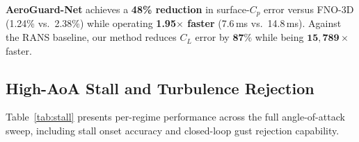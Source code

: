 \documentclass[10pt,twocolumn,letterpaper]{article}
\newcommand{\aeroguard}{\textbf{AeroGuard-Net}}
\newcommand{\CL}{C_L}
\newcommand{\Cp}{C_p}
\begin{document}
\aeroguard{} achieves a \textbf{48\% reduction} in surface-$\Cp$ error
versus FNO-3D (1.24\% vs.\ 2.38\%) while operating \textbf{1.95$\times$
faster} (7.6\,ms vs.\ 14.8\,ms). Against the RANS baseline, our
method reduces $\CL$ error by $\mathbf{87\%}$ while being
$\mathbf{15{,}789\times}$ faster.

\subsection{High-AoA Stall and Turbulence Rejection}
\label{subsec:stall}

Table~\ref{tab:stall} presents per-regime performance across the full
angle-of-attack sweep, including stall onset accuracy and closed-loop
gust rejection capability.

\begin{table}[t]
  \centering
  \caption{High-AoA stall onset and turbulence rejection performance.
    $\Delta\alpha_{\text{stall}}$ = absolute stall angle prediction
    error. Gust Rejection Time = time to restore $\CL^{\text{ref}}$
    after a 10\,m/s microburst impulse.}
  \label{tab:stall}
  \setlength{\tabcolsep}{3pt}
  \renewcommand{\arraystretch}{1.1}
\end{table}
\end{document}
